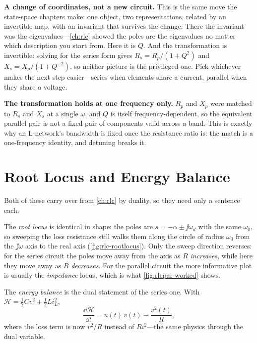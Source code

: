 \begin{controlsbox}
\textbf{A change of coordinates, not a new circuit.} This is the same move the
state-space chapters make: one object, two representations, related by an invertible
map, with an invariant that survives the change. There the invariant was the
eigenvalues---\cref{ch:rlc} showed the poles are the eigenvalues no matter which
description you start from. Here it is \(Q\). And the transformation is invertible:
solving for the series form gives
\(R_s=R_p/(1+Q^2)\) and \(X_s=X_p/(1+Q^{-2})\), so neither picture is the
privileged one. Pick whichever makes the next step easier---series when elements
share a current, parallel when they share a voltage.
\end{controlsbox}

\begin{mistakebox}
\textbf{The transformation holds at one frequency only.} \(R_p\) and \(X_p\) were
matched to \(R_s\) and \(X_s\) at a single \(\omega\), and \(Q\) is itself
frequency-dependent, so the equivalent parallel pair is not a fixed pair of
components valid across a band. This is exactly why an L-network's bandwidth is
fixed once the resistance ratio is: the match is a one-frequency identity, and
detuning breaks it.
\end{mistakebox}

\cite[pp.~30--32]{white2004highfrequency}

\section{Root Locus and Energy Balance}
Both of these carry over from \cref{ch:rlc} by duality, so they need only a sentence
each.

The \emph{root locus} is identical in shape: the poles are
\(s=-\alpha\pm\jj\omega_d\) with the same \(\omega_0\), so sweeping the loss
resistance still walks them along the circle of radius \(\omega_0\) from the
\(\jj\omega\) axis to the real axis (\cref{fig:rlc-rootlocus}). Only the sweep
direction reverses: for the series circuit the poles move away from the axis as
\(R\) \emph{increases}, while here they move away as \(R\) \emph{decreases}. For the
parallel circuit the more informative plot is usually the \emph{impedance} locus,
which is what \cref{fig:rlcpar-worked} shows.

The \emph{energy balance} is the dual statement of the series one. With
\(\mathcal{H}=\tfrac12 Cv^2+\tfrac12 Li_L^2\),
\[
\frac{\dd\mathcal{H}}{\dd t}=u(t)\,v(t)-\frac{v^2(t)}{R},
\]
where the loss term is now \(v^2/R\) instead of \(Ri^2\)---the same physics through
the dual variable.

